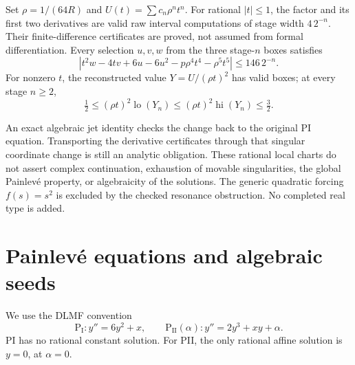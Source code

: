 \begin{theorem}
\label{thm:painleve-pole-chart}
Set $\rho=1/(64R)$ and $U(t)=\sum c_n\rho^nt^n$.
For rational $|t|\le1$, the factor and its first two derivatives are valid
raw interval computations of stage width $4\,2^{-n}$. Their finite-difference
certificates are proved, not assumed from formal differentiation.
Every selection $u,v,w$ from the three stage-$n$ boxes satisfies
\[
 |t^2w-4tv+6u-6u^2-p\rho^4t^4-\rho^5t^5|\le146\,2^{-n}.
\]
For nonzero $t$, the reconstructed value $Y=U/(\rho t)^2$ has valid boxes;
at every stage $n\ge2$,
\[
 \tfrac12\le(\rho t)^2\operatorname{lo}(Y_n)
 \le(\rho t)^2\operatorname{hi}(Y_n)\le\tfrac32.
\]
\leanok
\end{theorem}

An exact algebraic jet identity checks the change back to the original PI
equation. Transporting the derivative certificates through that singular
coordinate change is still an analytic obligation. These rational local
charts do not assert complex continuation, exhaustion of movable
singularities, the global Painlev\'e property, or algebraicity of the solutions.
The generic quadratic forcing $f(s)=s^2$ is excluded by the checked resonance
obstruction. No completed real type is added.
\leanok

\section{Painlev\'e equations and algebraic seeds}

We use the DLMF convention
\[
  \mathrm{P_I}: y''=6y^2+x,\qquad
  \mathrm{P_{II}}(\alpha): y''=2y^3+xy+\alpha.
\]
PI has no rational constant solution. For PII, the only rational affine
solution is $y=0$, at $\alpha=0$.
\leanok

